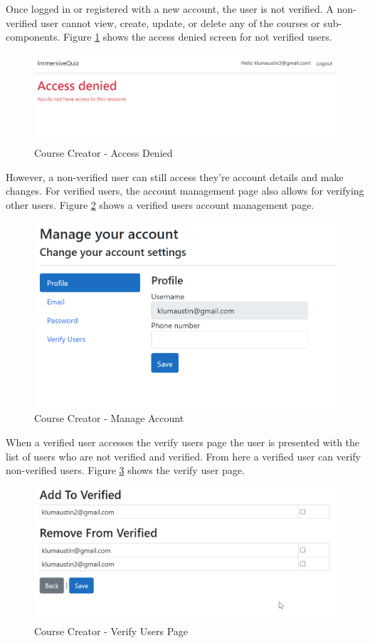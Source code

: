 Once logged in or registered with a new account, the user is not verified. A non-verified user cannot view, create, update, or delete any of the courses or sub-components. Figure \ref{CC Denied} shows the access denied screen for not verified users. 
\begin{figure}[htb]
	\centering
	\includegraphics[width=.5\textwidth]{Requirements/assets/cc-access-denied.png}
	\caption[Course Creator - Access Denied]{\label{CC Denied}Course Creator - Access Denied}
\end{figure}
However, a non-verified user can still access they're account details and make changes. For verified users, the account management page also allows for verifying other users. Figure \ref{CC Manage Account} shows a verified users account management page.
\begin{figure}[htb]
	\centering
	\includegraphics[width=.5\textwidth]{Requirements/assets/cc-manage-account.png}
	\caption[Course Creator - Manage Account]{\label{CC Manage Account}Course Creator - Manage Account}
\end{figure}
When a verified user accesses the verify users page the user is presented with the list of users who are not verified and verified. From here a verified user can verify non-verified users. Figure \ref{CC Verify} shows the verify user page. 
\begin{figure}[htb]
	\centering
	\includegraphics[width=.5\textwidth]{Requirements/assets/cc-add-verified-user.png}
	\caption[Course Creator - Verify Users Page]{\label{CC Verify}Course Creator - Verify Users Page}
\end{figure}
